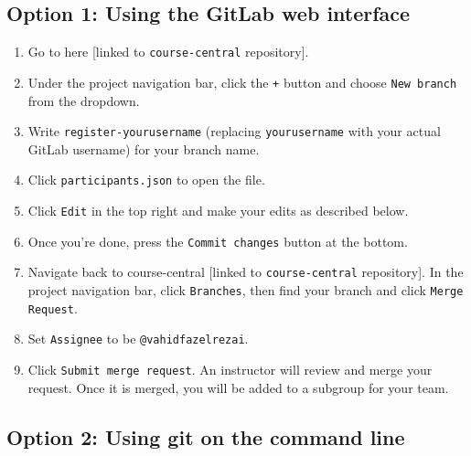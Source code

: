 \documentclass[12pt,twoside]{mitthesis}
\begin{document}
\subsection*{Option 1: Using the GitLab web interface}

\begin{enumerate}
\item Go to here [linked to \texttt{course-central} repository].
\item Under the project navigation bar, click the \texttt{+} button and choose \texttt{New branch} from the dropdown.
\item Write \texttt{register-yourusername} (replacing \texttt{yourusername} with your actual GitLab username) for your branch name.
\item Click \texttt{participants.json} to open the file.
\item Click \texttt{Edit} in the top right and make your edits as described below.
\item Once you're done, press the \texttt{Commit changes} button at the bottom.
\item Navigate back to course-central [linked to \texttt{course-central} repository]. In the project navigation bar, click \texttt{Branches}, then find your branch and click \texttt{Merge Request}.
\item Set \texttt{Assignee} to be \texttt{@vahidfazelrezai}.
\item Click \texttt{Submit merge request}. An instructor will review and merge your request. Once it is merged, you will be added to a subgroup for your team.
\end{enumerate}


\subsection*{Option 2: Using git on the command line}
\end{document}
